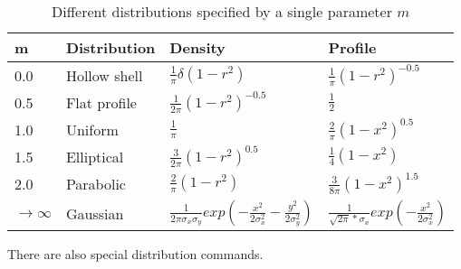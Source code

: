 \begin{table}[h!]
\begin{flushleft} \footnotesize
 \begin{tabular}{|l|l|l|l|}
\hline
\bf m & \bf Distribution & \bf Density & \bf Profile \\
\hline
0.0 & Hollow shell  & $\frac{1}{\pi}\delta(1-r^2)$ &$\frac{1}{\pi}(1-r^2)^{-0.5}$\\
\hline
0.5 & Flat profile  & $\frac{1}{2\pi}(1-r^2)^{-0.5}$ & $\frac{1}{2}$\\
\hline
1.0 & Uniform  & $\frac{1}{\pi}$ & $\frac{2}{\pi}(1-x^2)^{0.5}$\\
\hline
1.5 & Elliptical  & $\frac{3}{2\pi}(1-r^2)^{0.5}$ & $\frac{1}{4}(1-x^2)$ \\
\hline
2.0 & Parabolic  & $\frac{2}{\pi}(1-r^2)$ & $\frac{3}{8\pi}(1-x^2)^{1.5}$ \\
\hline
$\rightarrow \infty$ & Gaussian  & $\frac{1}{2\pi\sigma_x\sigma_y}exp(-\frac{x^2}{2\sigma_x^2} -\frac{y^2}{2\sigma_y^2})$ & 
                       $\frac{1}{\sqrt{2\pi}*\sigma_x}exp(-\frac{x^2}{2\sigma_x^2}) $ \\
\hline
\end{tabular}
\end{flushleft} 
\caption{\label{tab:binomdist}{Different distributions specified by a single parameter $m$}}
\end{table}
There are also special distribution commands.
